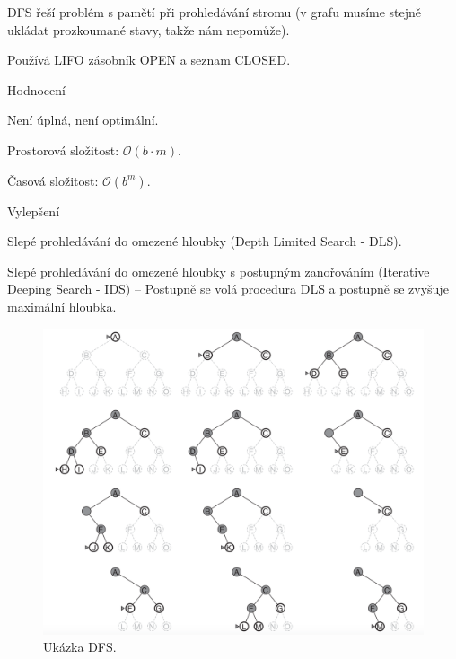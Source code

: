 \begin{compactitem}
    \item DFS řeší problém s pamětí při prohledávání stromu (v grafu musíme stejně ukládat prozkoumané stavy, takže nám nepomůže).
    \item Používá LIFO zásobník OPEN a seznam CLOSED.

    \item Hodnocení \begin{compactitem}
        \item Není úplná, není optimální.
        \item Prostorová složitost: $\mathcal{O}(b \cdot m)$.
        \item Časová složitost: $\mathcal{O}(b^m)$.
    \end{compactitem}

    \item Vylepšení \begin{compactitem}
        \item Slepé prohledávání do omezené hloubky (Depth Limited Search - DLS).
        \item Slepé prohledávání do omezené hloubky s postupným zanořováním (Iterative Deeping Search - IDS) -- Postupně se volá procedura DLS a postupně se zvyšuje maximální hloubka.
    \end{compactitem}

    \begin{figure}[H]
        \centering
        \includegraphics[width=1\linewidth]{dfs.png}
        \caption{Ukázka DFS.}
    \end{figure}
\end{compactitem}

